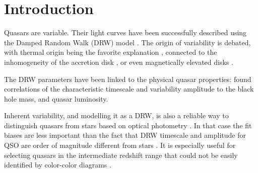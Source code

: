 \documentclass[twocolumn]{aastex62}
\begin{document}

\author[0000-0002-9589-1306]{Krzysztof L. Suberlak}


\author{\v{Z}eljko Ivezi\'c}



\author{Chelsea MacLeod}




\begin{abstract}

\end{abstract}



\section{Introduction}

Quasars are variable.  Their light curves have been successfully described using the Damped Random Walk (DRW) model \citep{kelly2009, macleod2010, kozlowski2010, zu2011, kasliwal2015a}. The origin of variability is debated, with thermal origin being the favorite explanation \citep{kelly2013}, connected to the inhomogeneity of the accretion disk \citep{dexter2011}, or even magnetically elevated disks \citep{dexter2019}. 

The DRW parameters have been linked to the physical quasar properties: \citet{macleod2010} found correlations of the characteristic timescale and variability amplitude  to the black hole mass, and quasar luminosity.

Inherent variability, and modelling it as  a DRW, is also a reliable way to distinguish quasars from stars based on  optical photometry \citep{macleod2011}.  In that case the fit biases are less important than the fact that DRW timescale and amplitude for QSO are order of  magnitude different from stars \citep{macleod2011}.  It is especially useful for selecting quasars in the intermediate redshift range that could not be easily identified by color-color diagrams \citep{sesar2007,yang2017}.  
\end{document}
